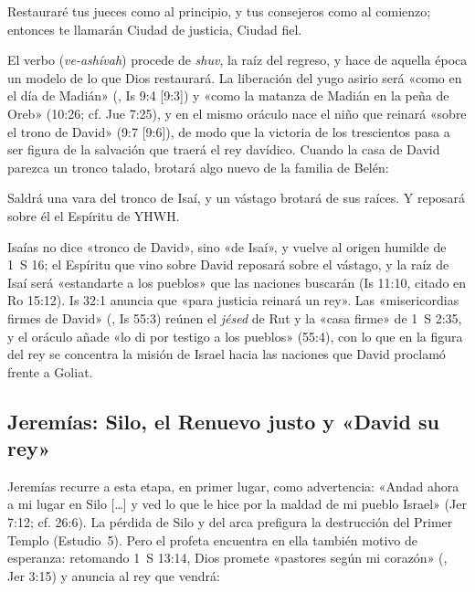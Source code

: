 \begin{cita}Restauraré tus jueces como al principio, y tus consejeros como al comienzo; entonces te llamarán Ciudad de justicia, Ciudad fiel.\end{cita}

El verbo  (\emph{ve-ashívah}) procede de \emph{shuv}, la raíz del regreso, y hace de aquella época un modelo de lo que Dios restaurará. La liberación del yugo asirio será «como en el día de Madián» (, Is 9:4 [9:3]) y «como la matanza de Madián en la peña de Oreb» (10:26; cf. Jue 7:25), y en el mismo oráculo nace el niño que reinará «sobre el trono de David» (9:7 [9:6]), de modo que la victoria de los trescientos pasa a ser figura de la salvación que traerá el rey davídico. Cuando la casa de David parezca un tronco talado, brotará algo nuevo de la familia de Belén:

\begin{cita}Saldrá una vara del tronco de Isaí, y un vástago brotará de sus raíces. Y reposará sobre él el Espíritu de YHWH.\end{cita}

Isaías no dice «tronco de David», sino «de Isaí», y vuelve al origen humilde de 1~S 16; el Espíritu que vino sobre David reposará sobre el vástago, y la raíz de Isaí será «estandarte a los pueblos» que las naciones buscarán (Is 11:10, citado en Ro 15:12). Is 32:1 anuncia que «para justicia reinará un rey». Las «misericordias firmes de David» (, Is 55:3) reúnen el \emph{jésed} de Rut y la «casa firme» de 1~S 2:35, y el oráculo añade «lo di por testigo a los pueblos» (55:4), con lo que en la figura del rey se concentra la misión de Israel hacia las naciones que David proclamó frente a Goliat.

\subsection{Jeremías: Silo, el Renuevo justo y «David su rey»}
Jeremías recurre a esta etapa, en primer lugar, como advertencia: «Andad ahora a mi lugar en Silo [\ldots] y ved lo que le hice por la maldad de mi pueblo Israel» (Jer 7:12; cf. 26:6). La pérdida de Silo y del arca prefigura la destrucción del Primer Templo (Estudio~5). Pero el profeta encuentra en ella también motivo de esperanza: retomando 1~S 13:14, Dios promete «pastores según mi corazón» (, Jer 3:15) y anuncia al rey que vendrá:

